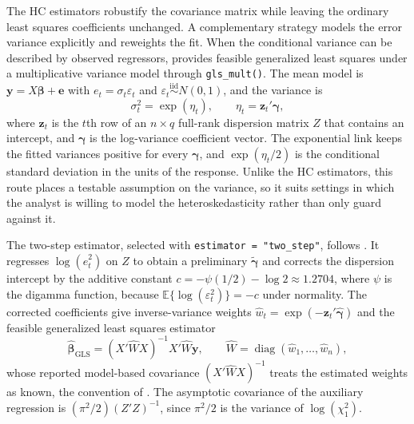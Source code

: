 The HC estimators robustify the covariance matrix while leaving the ordinary least squares coefficients unchanged. A complementary strategy models the error variance explicitly and reweights the fit. When the conditional variance can be described by observed regressors,  provides feasible generalized least squares under a multiplicative variance model through \texttt{gls\_mult()}. The mean model is \(\mathbf{y}=X\boldsymbol{\beta}+\mathbf{e}\) with \(e_t=\sigma_t\varepsilon_t\) and \(\varepsilon_t\stackrel{\mathrm{iid}}{\sim}N(0,1)\), and the variance is
\[
\sigma_t^2=\exp(\eta_t),\qquad \eta_t=\mathbf{z}_t'\boldsymbol{\gamma},
\]
where \(\mathbf{z}_t\) is the \(t\)th row of an \(n\times q\) full-rank dispersion matrix \(Z\) that contains an intercept, and \(\boldsymbol{\gamma}\) is the log-variance coefficient vector. The exponential link keeps the fitted variances positive for every \(\boldsymbol{\gamma}\), and \(\exp(\eta_t/2)\) is the conditional standard deviation in the units of the response. Unlike the HC estimators, this route places a testable assumption on the variance, so it suits settings in which the analyst is willing to model the heteroskedasticity rather than only guard against it.

The two-step estimator, selected with \texttt{estimator\ =\ "two\_step"}, follows \citet{Harvey1976}. It regresses \(\log(\hat e_t^2)\) on \(Z\) to obtain a preliminary \(\tilde{\boldsymbol{\gamma}}\) and corrects the dispersion intercept by the additive constant \(c=-\psi(1/2)-\log 2\approx 1.2704\), where \(\psi\) is the digamma function, because \(\mathbb{E}\{\log(\varepsilon_t^2)\}=-c\) under normality. The corrected coefficients give inverse-variance weights \(\hat w_t=\exp(-\mathbf{z}_t'\hat{\boldsymbol{\gamma}})\) and the feasible generalized least squares estimator
\[
\hat{\boldsymbol{\beta}}_{\mathrm{GLS}}=(X'\widehat W X)^{-1}X'\widehat W\mathbf{y},
\qquad \widehat W=\operatorname{diag}(\hat w_1,\ldots,\hat w_n),
\]
whose reported model-based covariance \((X'\widehat W X)^{-1}\) treats the estimated weights as known, the convention of \citet{CribariNetoPereira2019}. The asymptotic covariance of the auxiliary regression is \((\pi^2/2)(Z'Z)^{-1}\), since \(\pi^2/2\) is the variance of \(\log(\chi^2_1)\).

